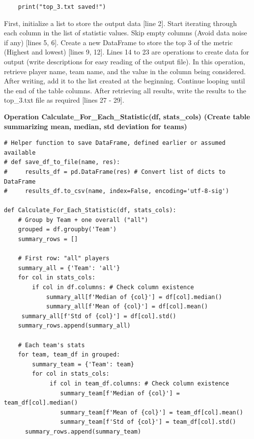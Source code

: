 \documentclass[12pt]{report}
\begin{document}
{{\begin{lstlisting}
    print("top_3.txt saved!")
\end{lstlisting}
First, initialize a list to store the output data [line 2]. Start iterating through each column in the list of statistic values. Skip empty columns (Avoid data noise if any) [lines 5, 6]. Create a new DataFrame to store the top 3 of the metric (Highest and lowest) [lines 9, 12]. Lines 14 to 23 are operations to create data for output (write descriptions for easy reading of the output file). In this operation, retrieve player name, team name, and the value in the column being considered. After writing, add it to the list created at the beginning. Continue looping until the end of the table columns. After retrieving all results, write the results to the top\_3.txt file as required [lines 27 - 29].

\textbf* {Operation Calculate\_For\_Each\_Statistic(df, stats\_cols) (Create table summarizing mean, median, std deviation for teams)} %
\begin{lstlisting}
# Helper function to save DataFrame, defined earlier or assumed available
# def save_df_to_file(name, res):
#     results_df = pd.DataFrame(res) # Convert list of dicts to DataFrame
#     results_df.to_csv(name, index=False, encoding='utf-8-sig')

def Calculate_For_Each_Statistic(df, stats_cols):
    # Group by Team + one overall ("all")
    grouped = df.groupby('Team')
    summary_rows = []

    # First row: "all" players
    summary_all = {'Team': 'all'}
    for col in stats_cols:
        if col in df.columns: # Check column existence
            summary_all[f'Median of {col}'] = df[col].median()
            summary_all[f'Mean of {col}'] = df[col].mean()
     summary_all[f'Std of {col}'] = df[col].std()
    summary_rows.append(summary_all)

    # Each team's stats
    for team, team_df in grouped:
        summary_team = {'Team': team}
        for col in stats_cols:
             if col in team_df.columns: # Check column existence
                summary_team[f'Median of {col}'] = team_df[col].median()
                summary_team[f'Mean of {col}'] = team_df[col].mean()
                summary_team[f'Std of {col}'] = team_df[col].std()
      summary_rows.append(summary_team)


\end{lstlisting}}}
\end{document}
